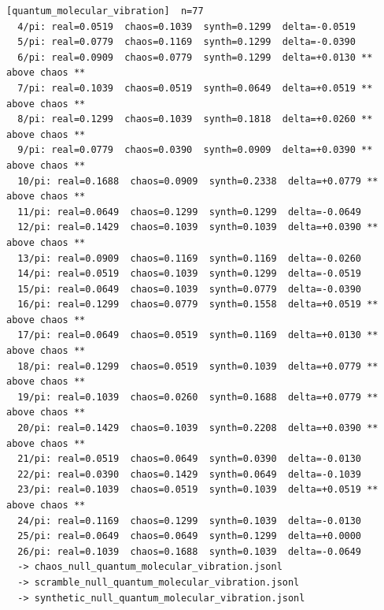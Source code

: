 \documentclass[11pt, letterpaper, openany]{book}
\begin{document}
\begin{empiricalbox}
\begin{lstlisting}[style=terminal]
[quantum_molecular_vibration]  n=77
  4/pi: real=0.0519  chaos=0.1039  synth=0.1299  delta=-0.0519
  5/pi: real=0.0779  chaos=0.1169  synth=0.1299  delta=-0.0390
  6/pi: real=0.0909  chaos=0.0779  synth=0.1299  delta=+0.0130 ** above chaos **
  7/pi: real=0.1039  chaos=0.0519  synth=0.0649  delta=+0.0519 ** above chaos **
  8/pi: real=0.1299  chaos=0.1039  synth=0.1818  delta=+0.0260 ** above chaos **
  9/pi: real=0.0779  chaos=0.0390  synth=0.0909  delta=+0.0390 ** above chaos **
  10/pi: real=0.1688  chaos=0.0909  synth=0.2338  delta=+0.0779 ** above chaos **
  11/pi: real=0.0649  chaos=0.1299  synth=0.1299  delta=-0.0649
  12/pi: real=0.1429  chaos=0.1039  synth=0.1039  delta=+0.0390 ** above chaos **
  13/pi: real=0.0909  chaos=0.1169  synth=0.1169  delta=-0.0260
  14/pi: real=0.0519  chaos=0.1039  synth=0.1299  delta=-0.0519
  15/pi: real=0.0649  chaos=0.1039  synth=0.0779  delta=-0.0390
  16/pi: real=0.1299  chaos=0.0779  synth=0.1558  delta=+0.0519 ** above chaos **
  17/pi: real=0.0649  chaos=0.0519  synth=0.1169  delta=+0.0130 ** above chaos **
  18/pi: real=0.1299  chaos=0.0519  synth=0.1039  delta=+0.0779 ** above chaos **
  19/pi: real=0.1039  chaos=0.0260  synth=0.1688  delta=+0.0779 ** above chaos **
  20/pi: real=0.1429  chaos=0.1039  synth=0.2208  delta=+0.0390 ** above chaos **
  21/pi: real=0.0519  chaos=0.0649  synth=0.0390  delta=-0.0130
  22/pi: real=0.0390  chaos=0.1429  synth=0.0649  delta=-0.1039
  23/pi: real=0.1039  chaos=0.0519  synth=0.1039  delta=+0.0519 ** above chaos **
  24/pi: real=0.1169  chaos=0.1299  synth=0.1039  delta=-0.0130
  25/pi: real=0.0649  chaos=0.0649  synth=0.1299  delta=+0.0000
  26/pi: real=0.1039  chaos=0.1688  synth=0.1039  delta=-0.0649
  -> chaos_null_quantum_molecular_vibration.jsonl
  -> scramble_null_quantum_molecular_vibration.jsonl
  -> synthetic_null_quantum_molecular_vibration.jsonl


\end{lstlisting}
\end{empiricalbox}
\end{document}
